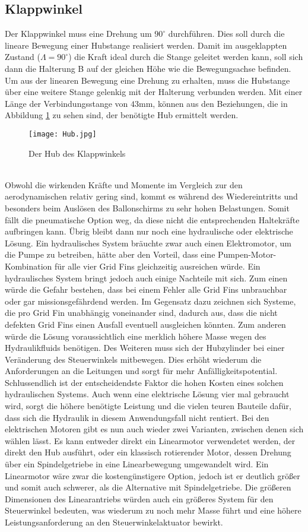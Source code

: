 \subsection{Klappwinkel}
Der Klappwinkel muss eine Drehung um $90^\circ$ durchführen. Dies soll durch die lineare Bewegung einer Hubstange realisiert werden. Damit im ausgeklappten Zustand ($\Lambda = 90^\circ$) die Kraft ideal durch die Stange geleitet werden kann, soll sich dann die Halterung B auf der gleichen Höhe wie die Bewegungsachse befinden. Um aus der linearen Bewegung eine Drehung zu erhalten, muss die Hubstange über eine weitere Stange gelenkig mit der Halterung verbunden werden. Mit einer Länge der Verbindungsstange von $43$mm, können aus den Beziehungen, die in Abbildung \ref{abb_hub} zu sehen sind, der benötigte Hub ermittelt werden.
\begin{figure}[h]
	\centering
	\texttt{[image: Hub.jpg]}
	\caption{Der Hub des Klappwinkels}
	\label{abb_hub}
\end{figure}\\
Obwohl die wirkenden Kräfte und Momente im Vergleich zur den aerodynamischen relativ gering sind, kommt es während des Wiedereintritts und besonders beim Auslösen des Ballonschirms zu sehr hohen Belastungen. Somit fällt die pneumatische Option weg, da diese nicht die entsprechenden Haltekräfte aufbringen kann. Übrig bleibt dann nur noch eine hydraulische oder elektrische Lösung. Ein hydraulisches System bräuchte zwar auch einen Elektromotor, um die Pumpe zu betreiben, hätte aber den Vorteil, dass eine Pumpen-Motor-Kombination für alle vier Grid Fins gleichzeitig ausreichen würde. Ein hydraulisches System bringt jedoch auch einige Nachteile mit sich. Zum einen würde die Gefahr bestehen, dass bei einem Fehler alle Grid Fins unbrauchbar oder gar missionsgefährdend werden. Im Gegensatz dazu zeichnen sich Systeme, die pro Grid Fin unabhängig voneinander sind, dadurch aus, dass die nicht defekten Grid Fins einen Ausfall eventuell ausgleichen könnten. Zum anderen würde die Lösung voraussichtlich eine merklich höhere Masse wegen des Hydraulikfluids benötigen. Des Weiteren muss sich der Hubzylinder bei einer Veränderung des Steuerwinkels mitbewegen. Dies erhöht wiederum die Anforderungen an die Leitungen und sorgt für mehr Anfälligkeitspotential. Schlussendlich ist der entscheidendste Faktor die hohen Kosten eines solchen hydraulischen Systems. Auch wenn eine elektrische Lösung vier mal gebraucht wird, sorgt die höhere benötigte Leistung und die vielen teuren Bauteile dafür, dass sich die Hydraulik in diesem Anwendungsfall nicht rentiert. Bei den elektrischen Motoren gibt es nun auch wieder zwei Varianten, zwischen denen sich wählen lässt. Es kann entweder direkt ein Linearmotor verwendetet werden, der direkt den Hub ausführt, oder ein klassisch rotierender Motor, dessen Drehung über ein Spindelgetriebe in eine Linearbewegung umgewandelt wird. Ein Linearmotor wäre zwar die kostengünstigere Option, jedoch ist er deutlich größer und somit auch schwerer, als die Alternative mit Spindelgetriebe. Die größeren Dimensionen des Linearantriebs würden auch ein größeres System für den Steuerwinkel bedeuten, was wiederum zu noch mehr Masse führt und eine höhere Leistungsanforderung an den Steuerwinkelaktuator bewirkt.

